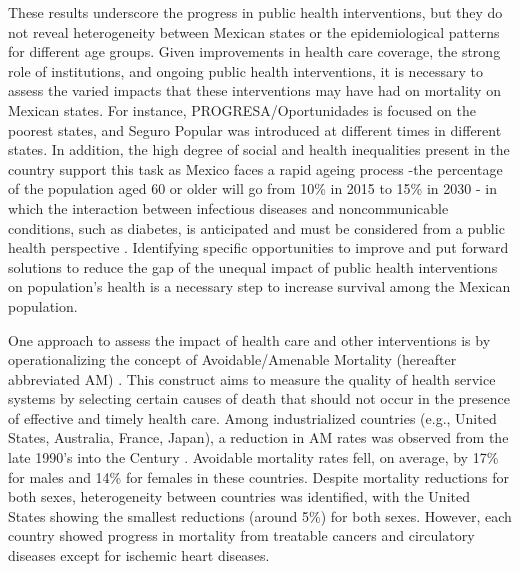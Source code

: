 \documentclass[11.5pt]{article}
\begin{document}
\begin{spacing}{1.5}
These results underscore the progress in public health interventions, but they do not reveal heterogeneity between Mexican states or the epidemiological patterns for different age groups. Given improvements in health care coverage, the strong role of institutions, and ongoing public
 health interventions, it is necessary to assess the varied impacts that
 these interventions may have had on mortality on Mexican states. For instance, PROGRESA/Oportunidades is focused on the poorest states, and Seguro Popular was introduced at different times in different states. In addition, the high degree of social and health inequalities present in the country \citep{Frenk2006} support this task as Mexico faces a rapid ageing process -the percentage of the population aged 60 or older will go from 10\% in 2015 to 15\% in 2030  \citep{CONAPO}- in which the interaction between infectious diseases and noncommunicable conditions, such as diabetes, is anticipated and must be considered from a public health perspective \citep{Bygbjerg1499}. Identifying specific opportunities to improve and put forward solutions to reduce the gap of  the unequal impact of public health interventions on population's health is a necessary step to increase survival among the Mexican population.
 
 One approach to assess the impact of health care and other interventions is by operationalizing the
 concept of Avoidable/Amenable Mortality (hereafter abbreviated AM)
 \citep{nolte&mckee2004, nolte&mckee2008,elo2014}. This construct aims to measure the quality of health service systems by selecting certain
 causes of death that should not occur in the presence of effective and
 timely health care. Among industrialized countries (e.g., United States,
 Australia, France, Japan), a reduction in AM rates was
 observed from the late 1990's into the  Century
 \citep{nolte&mckee2008}. Avoidable mortality rates fell, on average, by 17\%
 for males and 14\% for females in these countries. Despite mortality reductions for
 both sexes, heterogeneity between countries was identified, with the United
 States showing the smallest reductions (around 5\%) for both sexes. However,
 each country showed progress in mortality from treatable cancers and
 circulatory diseases except for ischemic heart diseases.


\end{spacing}
\end{document}
